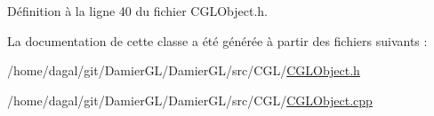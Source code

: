 Définition à la ligne 40 du fichier C\-G\-L\-Object.\-h.



La documentation de cette classe a été générée à partir des fichiers suivants \-:\begin{DoxyCompactItemize}
\item 
/home/dagal/git/\-Damier\-G\-L/\-Damier\-G\-L/src/\-C\-G\-L/\hyperlink{_c_g_l_object_8h}{C\-G\-L\-Object.\-h}\item 
/home/dagal/git/\-Damier\-G\-L/\-Damier\-G\-L/src/\-C\-G\-L/\hyperlink{_c_g_l_object_8cpp}{C\-G\-L\-Object.\-cpp}\end{DoxyCompactItemize}
